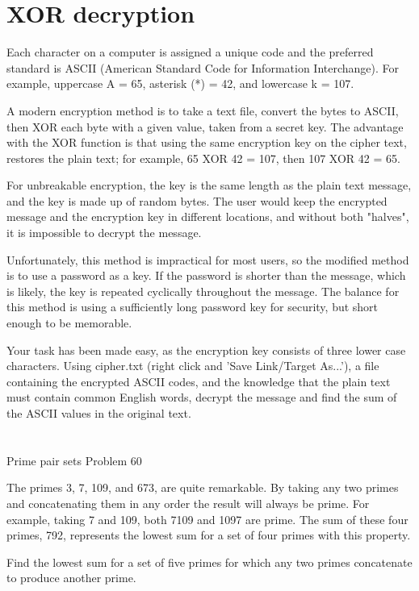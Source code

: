 \section{XOR decryption} \label{pb.059}

Each character on a computer is assigned a unique code and the preferred standard is ASCII (American Standard Code for Information Interchange). For example, uppercase A = 65, asterisk (*) = 42, and lowercase k = 107.

A modern encryption method is to take a text file, convert the bytes to ASCII, then XOR each byte with a given value, taken from a secret key. The advantage with the XOR function is that using the same encryption key on the cipher text, restores the plain text; for example, 65 XOR 42 = 107, then 107 XOR 42 = 65.

For unbreakable encryption, the key is the same length as the plain text message, and the key is made up of random bytes. The user would keep the encrypted message and the encryption key in different locations, and without both "halves", it is impossible to decrypt the message.

Unfortunately, this method is impractical for most users, so the modified method is to use a password as a key. If the password is shorter than the message, which is likely, the key is repeated cyclically throughout the message. The balance for this method is using a sufficiently long password key for security, but short enough to be memorable.

Your task has been made easy, as the encryption key consists of three lower case characters. Using cipher.txt (right click and 'Save Link/Target As...'), a file containing the encrypted ASCII codes, and the knowledge that the plain text must contain common English words, decrypt the message and find the sum of the ASCII values in the original text.

\section{} \label{pb.060}
Prime pair sets
Problem 60

The primes 3, 7, 109, and 673, are quite remarkable. By taking any two primes and concatenating them in any order the result will always be prime. For example, taking 7 and 109, both 7109 and 1097 are prime. The sum of these four primes, 792, represents the lowest sum for a set of four primes with this property.

Find the lowest sum for a set of five primes for which any two primes concatenate to produce another prime.

